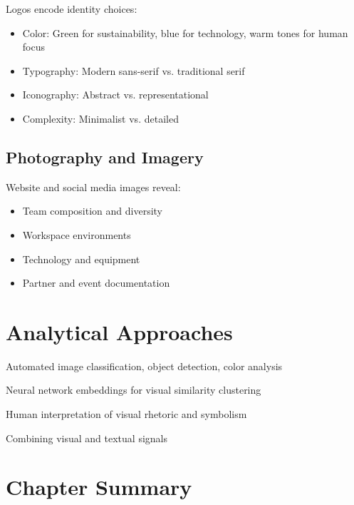 Logos encode identity choices:
\begin{itemize}[leftmargin=*, itemsep=0.2em]
\item Color: Green for sustainability, blue for technology, warm tones for human focus
\item Typography: Modern sans-serif vs. traditional serif
\item Iconography: Abstract vs. representational
\item Complexity: Minimalist vs. detailed
\end{itemize}

\subsection*{Photography and Imagery}

Website and social media images reveal:
\begin{itemize}[leftmargin=*, itemsep=0.2em]
\item Team composition and diversity
\item Workspace environments
\item Technology and equipment
\item Partner and event documentation
\end{itemize}


\section*{Analytical Approaches}

\begin{description}[leftmargin=0.5cm, itemsep=0.3em]
\item[Computer Vision] Automated image classification, object detection, color analysis
\item[Embedding Similarity] Neural network embeddings for visual similarity clustering
\item[Qualitative Coding] Human interpretation of visual rhetoric and symbolism
\item[Multimodal Integration] Combining visual and textual signals
\end{description}


\section*{Chapter Summary}

